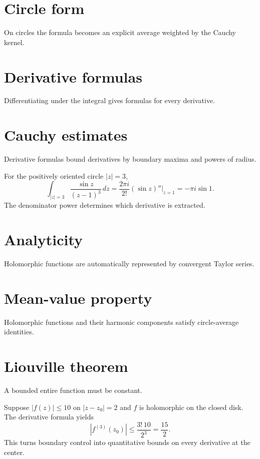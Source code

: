 \section{Circle form}
On circles the formula becomes an explicit average weighted by the Cauchy kernel.

\section{Derivative formulas}
Differentiating under the integral gives formulas for every derivative.

\section{Cauchy estimates}
Derivative formulas bound derivatives by boundary maxima and powers of radius.

\begin{example}\label{ex:iv06-expand-02}
For the positively oriented circle \(|z|=3\),
\[
\int_{|z|=3}\frac{\sin z}{(z-1)^3}\,dz
=\frac{2\pi i}{2!}(\sin z)''\big|_{z=1}
=-\pi i\sin1.
\]
The denominator power determines which derivative is extracted.
\end{example}
\section{Analyticity}
Holomorphic functions are automatically represented by convergent Taylor series.

\section{Mean-value property}
Holomorphic functions and their harmonic components satisfy circle-average identities.

\section{Liouville theorem}
A bounded entire function must be constant.

\begin{example}\label{ex:iv06-expand-03}
Suppose \(|f(z)|\le10\) on \(|z-z_0|=2\) and \(f\) is holomorphic on the closed disk. The derivative formula yields
\[
|f^{(3)}(z_0)|\le \frac{3!\,10}{2^3}=\frac{15}{2}.
\]
This turns boundary control into quantitative bounds on every derivative at the center.
\end{example}
